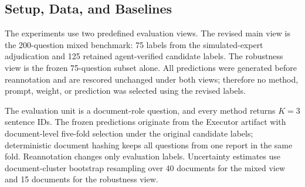 \documentclass{article}
\begin{document}
\subsection{Setup, Data, and Baselines}
\label{sec:setup_and_data}

The experiments use two predefined evaluation views. The revised main view is the 200-question mixed benchmark: 75 labels from the simulated-expert adjudication and 125 retained agent-verified candidate labels. The robustness view is the frozen 75-question subset alone. All predictions were generated before reannotation and are rescored unchanged under both views; therefore no method, prompt, weight, or prediction was selected using the revised labels.

The evaluation unit is a document-role question, and every method returns $K=3$ sentence IDs. The frozen predictions originate from the Executor artifact with document-level five-fold selection under the original candidate labels; deterministic document hashing keeps all questions from one report in the same fold. Reannotation changes only evaluation labels. Uncertainty estimates use document-cluster bootstrap resampling over 40 documents for the mixed view and 15 documents for the robustness view.
\end{document}
